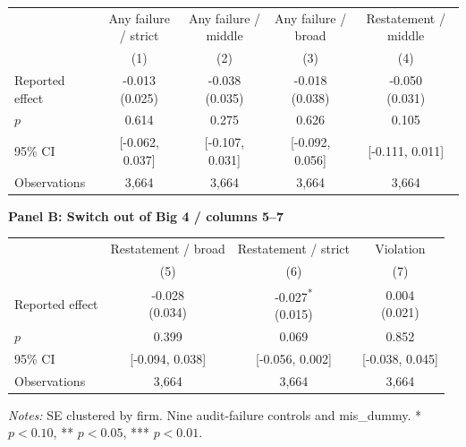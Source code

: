 \documentclass[10pt]{article}
\newcommand{\sym}[1]{\textsuperscript{#1}}
\begin{document}
\begin{tabular*}{\textwidth}{@{\extracolsep{\fill}}lcccc@{}}
\toprule
 & Any failure / strict & Any failure / middle & Any failure / broad & Restatement / middle \\
 & (1) & (2) & (3) & (4) \\
\midrule
Reported effect & \shortstack{-0.013\\(0.025)} & \shortstack{-0.038\\(0.035)} & \shortstack{-0.018\\(0.038)} & \shortstack{-0.050\\(0.031)} \\
$p$ & 0.614 & 0.275 & 0.626 & 0.105 \\
95\% CI & [-0.062, 0.037] & [-0.107, 0.031] & [-0.092, 0.056] & [-0.111, 0.011] \\
Observations & 3,664 & 3,664 & 3,664 & 3,664 \\
\bottomrule\end{tabular*}\par
\medskip\textbf{Panel B: Switch out of Big 4 / columns 5--7}\par\smallskip
\begin{tabular*}{\textwidth}{@{\extracolsep{\fill}}lccc@{}}
\toprule
 & Restatement / broad & Restatement / strict & Violation \\
 & (5) & (6) & (7) \\
\midrule
Reported effect & \shortstack{-0.028\\(0.034)} & \shortstack{-0.027\sym{*}\\(0.015)} & \shortstack{0.004\\(0.021)} \\
$p$ & 0.399 & 0.069 & 0.852 \\
95\% CI & [-0.094, 0.038] & [-0.056, 0.002] & [-0.038, 0.045] \\
Observations & 3,664 & 3,664 & 3,664 \\
\bottomrule\end{tabular*}\par
\medskip\fontsize{9}{11}\selectfont\textit{Notes:} SE clustered by firm. Nine audit-failure controls and mis\_dummy. * $p<0.10$, ** $p<0.05$, *** $p<0.01$.
\end{document}
